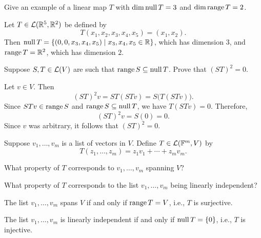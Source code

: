 \begin{exc}

\begin{exercise}
Give an example of a linear map $T$ with $\operatorname{dim}\operatorname{null} T=3$ and
$\operatorname{dim}\operatorname{range} T=2$.
\end{exercise}
\begin{solution}
Let $T\in\mathcal{L}(\mathbb{R}^5,\mathbb{R}^2)$ be defined by
\[ T(x_1,x_2,x_3,x_4,x_5)=(x_1,x_2). \]
Then $\operatorname{null} T=\{(0,0,x_3,x_4,x_5)\mid x_3,x_4,x_5\in\mathbb{R}\}$, which has dimension
$3$, and $\operatorname{range} T=\mathbb{R}^2$, which has dimension $2$.
\end{solution}

\begin{exercise}
Suppose $S,T\in\mathcal{L}(V)$ are such that $\operatorname{range} S\subseteq\operatorname{null} T$. Prove that
$(ST)^2=0$.
\end{exercise}
\begin{solution}
Let $v\in V$. Then
\[ (ST)^2v=ST(STv)=S\bigl(T(STv)\bigr). \]
Since $STv\in\operatorname{range} S$ and $\operatorname{range} S\subseteq\operatorname{null} T$, we have $T(STv)=0$.
Therefore,
\[ (ST)^2v=S(0)=0. \]
Since $v$ was arbitrary, it follows that $(ST)^2=0$.
\end{solution}

\begin{exercise}
Suppose $v_1,\dots,v_m$ is a list of vectors in $V$. Define
$T\in\mathcal{L}(\mathbb{F}^m,V)$ by
\[ T(z_1,\dots,z_m)=z_1v_1+\cdots+z_mv_m. \]
\begin{parts}
\item What property of $T$ corresponds to $v_1,\dots,v_m$ spanning $V$?
\item What property of $T$ corresponds to the list $v_1,\dots,v_m$ being
  linearly independent?
\end{parts}
\end{exercise}
\begin{solution}\leavevmode
\begin{parts}
\item The list $v_1,\dots,v_m$ spans $V$ if and only if $\operatorname{range} T=V$, i.e.,
  $T$ is surjective.
\item The list $v_1,\dots,v_m$ is linearly independent if and only if
  $\operatorname{null} T=\{0\}$, i.e., $T$ is injective.
\end{parts}
\end{solution}


\end{exc}
